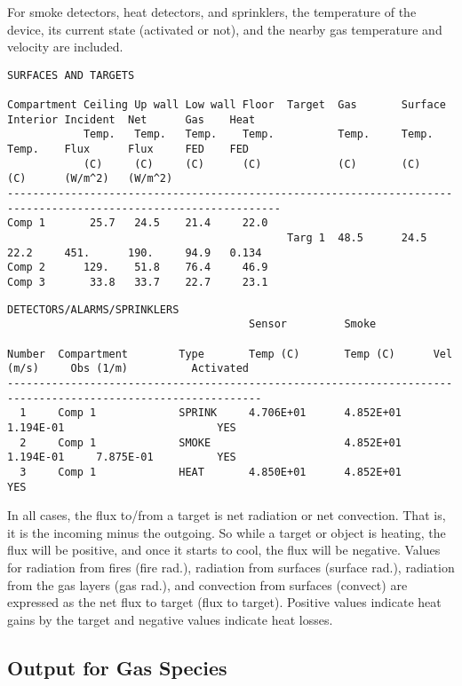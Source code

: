 For smoke detectors, heat detectors, and sprinklers, the temperature of the device, its current state (activated or not), and the nearby gas temperature and velocity are included.

\begin{lstlisting}[basicstyle=\tiny]
SURFACES AND TARGETS

Compartment Ceiling Up wall Low wall Floor  Target  Gas       Surface   Interior Incident  Net      Gas    Heat
            Temp.   Temp.   Temp.    Temp.          Temp.     Temp.     Temp.    Flux      Flux     FED    FED
            (C)     (C)     (C)      (C)            (C)       (C)       (C)      (W/m^2)   (W/m^2)
-----------------------------------------------------------------------------------------------------------------
Comp 1       25.7   24.5    21.4     22.0
                                            Targ 1  48.5      24.5      22.2     451.      190.     94.9   0.134
Comp 2      129.    51.8    76.4     46.9
Comp 3       33.8   33.7    22.7     23.1

\end{lstlisting}

\begin{lstlisting}[basicstyle=\tiny]
DETECTORS/ALARMS/SPRINKLERS
                                      Sensor         Smoke

Number  Compartment        Type       Temp (C)       Temp (C)      Vel (m/s)     Obs (1/m)          Activated
--------------------------------------------------------------------------------------------------------------
  1     Comp 1             SPRINK     4.706E+01      4.852E+01     1.194E-01                        YES
  2     Comp 1             SMOKE                     4.852E+01     1.194E-01     7.875E-01          YES
  3     Comp 1             HEAT       4.850E+01      4.852E+01                                      YES
\end{lstlisting}
In all cases, the flux to/from a target is net radiation or net convection. That is, it is the incoming minus the outgoing. So while a target or object is heating, the flux will be positive, and once it starts to cool, the flux will be negative. Values for radiation from fires (fire rad.), radiation from surfaces (surface rad.), radiation from the gas layers (gas rad.), and convection from surfaces (convect) are expressed as the net flux to target (flux to target). Positive values indicate heat gains by the target and negative values indicate heat losses.


\subsection{Output for Gas Species}

